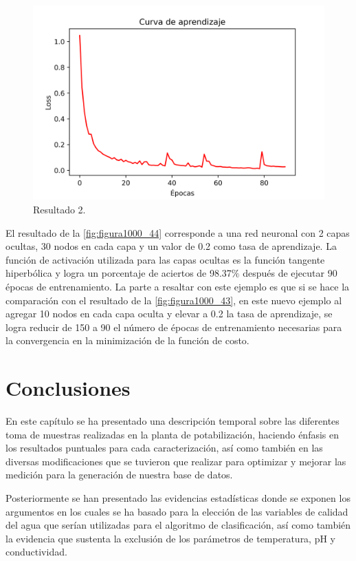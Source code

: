 \begin{figure}[h]
	\centering
	\includegraphics[scale=0.71]{imgss194.png}
	\caption{Resultado 2.}
	\label{fig:figura1000_44}
\end{figure}

\clearpage

El resultado de la \autoref{fig:figura1000_44} corresponde a una red neuronal con 2 capas ocultas, 30 nodos en cada capa y un valor de 0.2 como tasa de aprendizaje. La función de activación utilizada para las capas ocultas es la 
función tangente hiperbólica y logra un porcentaje de aciertos de 98.37$\%$ después de ejecutar 90 épocas de entrenamiento.
La parte a resaltar con este ejemplo es que si se hace la comparación con el resultado de la \autoref{fig:figura1000_43}, en este nuevo ejemplo al agregar 10 nodos en cada capa oculta y elevar a 0.2 la tasa de aprendizaje, 
se logra reducir de 150 a 90 el número de épocas de entrenamiento necesarias para la convergencia en la minimización de la función de costo.

\section{Conclusiones}

En este capítulo se ha presentado una descripción temporal sobre las diferentes toma de muestras realizadas en la planta de potabilización, haciendo énfasis en los resultados puntuales para cada caracterización, así como 
también en las diversas modificaciones que se tuvieron que realizar para optimizar y mejorar las medición para la generación de nuestra base de datos.

Posteriormente se han presentado las evidencias estadísticas donde se exponen los argumentos en los cuales se ha basado para la elección de las variables de calidad del agua que serían utilizadas para el algoritmo de clasificación, 
así como también la evidencia que sustenta la exclusión de los parámetros de temperatura, pH y conductividad.

